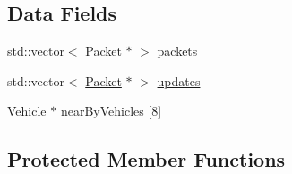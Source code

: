 \subsection*{Data Fields}
\begin{DoxyCompactItemize}
\item 
std\+::vector$<$ \hyperlink{struct_packet}{Packet} $\ast$ $>$ \hyperlink{class_vehicle_a4e624a924953072b730cbc3d8045735f}{packets}
\item 
std\+::vector$<$ \hyperlink{struct_packet}{Packet} $\ast$ $>$ \hyperlink{class_vehicle_a8b1176051f8d0fdc579e21bfe1660ece}{updates}
\item 
\hyperlink{class_vehicle}{Vehicle} $\ast$ \hyperlink{class_vehicle_a4ef4786810a90ca81c0b02f6005fc36a}{near\+By\+Vehicles} \mbox{[}8\mbox{]}
\end{DoxyCompactItemize}
\subsection*{Protected Member Functions}

